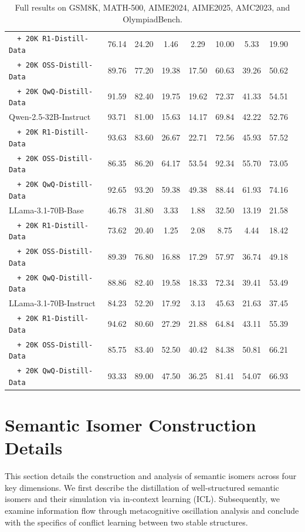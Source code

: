 \begin{table}[t]
{\begin{tabular}{lcccccccc}
    \texttt{\ \ + 20K R1-Distill-Data} & 76.14 & 24.20 & 1.46 & 2.29 & 10.00 & 5.33 & 19.90 \\
    \texttt{\ \ + 20K OSS-Distill-Data} & 89.76 & 77.20 & 19.38 & 17.50 & 60.63 & 39.26 & 50.62 \\
    \texttt{\ \ + 20K QwQ-Distill-Data} & 91.59 & 82.40 & 19.75 & 19.62 & 72.37 & 41.33 & 54.51 \\
    \midrule
    Qwen-2.5-32B-Instruct & 93.71 & 81.00 & 15.63 & 14.17 & 69.84 & 42.22 & 52.76 \\
    \texttt{\ \ + 20K R1-Distill-Data} & 93.63 & 83.60 & 26.67 & 22.71 & 72.56 & 45.93 & 57.52 \\
    \texttt{\ \ + 20K OSS-Distill-Data} & 86.35 & 86.20 & 64.17 & 53.54 & 92.34 & 55.70 & 73.05 \\
    \texttt{\ \ + 20K QwQ-Distill-Data} & 92.65 & 93.20 & 59.38 & 49.38 & 88.44 & 61.93 & 74.16 \\
    \midrule
    LLama-3.1-70B-Base & 46.78 & 31.80 & 3.33 & 1.88 & 32.50 & 13.19 & 21.58 \\
    \texttt{\ \ + 20K R1-Distill-Data} & 73.62 & 20.40 & 1.25 & 2.08 & 8.75 & 4.44 & 18.42 \\
    \texttt{\ \ + 20K OSS-Distill-Data} & 89.39 & 76.80 & 16.88 & 17.29 & 57.97 & 36.74 & 49.18 \\
    \texttt{\ \ + 20K QwQ-Distill-Data} & 88.86 & 82.40 & 19.58 & 18.33 & 72.34 & 39.41 & 53.49 \\
    \midrule
    LLama-3.1-70B-Instruct& 84.23 & 52.20 & 17.92 & 3.13 & 45.63 & 21.63 & 37.45 \\
    \texttt{\ \ + 20K R1-Distill-Data}& 94.62 & 80.60 & 27.29 & 21.88 & 64.84 & 43.11 & 55.39 \\
    \texttt{\ \ + 20K OSS-Distill-Data}& 85.75 & 83.40 & 52.50 & 40.42 & 84.38 & 50.81 & 66.21 \\
    \texttt{\ \ + 20K QwQ-Distill-Data}& 93.33 & 89.00 & 47.50 & 36.25 & 81.41 & 54.07 & 66.93
    \\
\bottomrule
\end{tabular}
}
\caption{Full results on GSM8K, MATH-500, AIME2024, AIME2025, AMC2023, and OlympiadBench.}
\label{tab:full_distill_result}
\end{table}



\section{Semantic Isomer Construction Details}
\label{sec:appendix_isomers}
This section details the construction and analysis of semantic isomers across four key dimensions. We first describe the distillation of well-structured semantic isomers and their simulation via in-context learning (ICL). Subsequently, we examine information flow through metacognitive oscillation analysis and conclude with the specifics of conflict learning between two stable structures.




